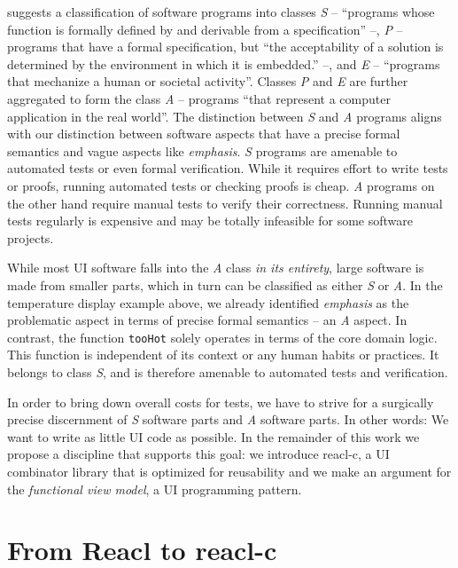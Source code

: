 \documentclass[sigplan,screen]{acmart}
\begin{document}
\cite{SPE} suggests a classification of software programs into classes
\textit{S} -- ``programs whose function is formally defined by and
derivable from a specification'' --, \textit{P} -- programs that have
a formal specification, but ``the acceptability of a solution is
determined by the environment in which it is embedded.''  --, and
\textit{E} -- ``programs that mechanize a human or societal
activity''. Classes \textit{P} and \textit{E} are further aggregated
to form the class \textit{A} -- programs ``that represent a computer
application in the real world''. The distinction between \textit{S}
and \textit{A} programs aligns with our distinction between software
aspects that have a precise formal semantics and vague aspects like
\textit{emphasis}. \textit{S} programs are amenable to automated tests
or even formal verification. While it requires effort to write tests
or proofs, running automated tests or checking proofs is
cheap. \textit{A} programs on the other hand require manual tests to
verify their correctness. Running manual tests regularly is expensive
and may be totally infeasible for some software projects.

While most UI software falls into the \textit{A} class \textit{in its
  entirety}, large software is made from smaller parts, which in turn
can be classified as either \textit{S} or \textit{A}. In the
temperature display example above, we already identified
\textit{emphasis} as the problematic aspect in terms of precise formal
semantics -- an \textit{A} aspect. In contrast, the function
\texttt{tooHot} solely operates in terms of the core domain
logic. This function is independent of its context or any human habits
or practices. It belongs to class \textit{S}, and is therefore
amenable to automated tests and verification.

In order to bring down overall costs for tests, we have to strive for
a surgically precise discernment of \textit{S} software parts and
\textit{A} software parts. In other words: We want to write as little
UI code as possible. In the remainder of this work we propose a
discipline that supports this goal: we introduce reacl-c, a UI
combinator library that is optimized for reusability and we make an
argument for the \textit{functional view model}, a UI programming
pattern.

\section{From Reacl to reacl-c}
\label{sec:reacl-c}
\end{document}

